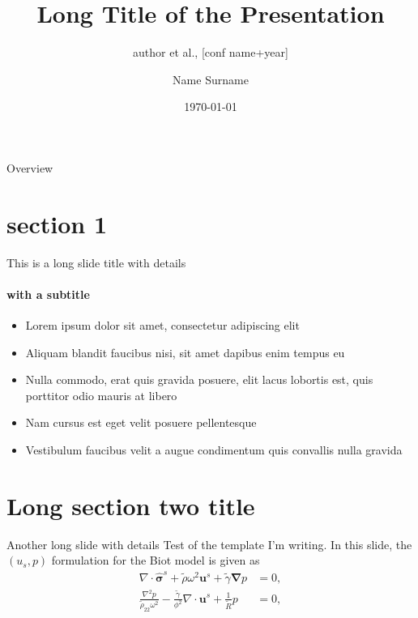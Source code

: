 \documentclass[aspectratio=169,xcolor=dvipsnames, t]{beamer}
\title[short title]{Long Title of the Presentation}
\subtitle{author et al., [conf name+year]}
\author[Surname]{Name Surname}
\institute[lab]{Name of the lab and/or institution}
\date{\today} %
\begin{document}
\begin{frame}[plain]
    \maketitle
\end{frame}
\begin{frame}[plain]{Overview}
    \tableofcontents
\end{frame}

\section{section 1}
\begin{frame}[t]{This is a long slide title with details}
    \framesubtitle{with a subtitle}
    \begin{itemize}
        \item Lorem ipsum dolor sit amet, consectetur adipiscing elit
        \item Aliquam blandit faucibus nisi, sit amet dapibus enim tempus eu
        \item Nulla commodo, erat quis gravida posuere, elit lacus lobortis est, quis porttitor odio mauris at libero
        \item Nam cursus est eget velit posuere pellentesque
        \item Vestibulum faucibus velit a augue condimentum quis convallis nulla gravida
    \end{itemize}
\end{frame}
\section{Long section two title}
\begin{frame}[t]{Another long slide with details}
    Test of the template I'm writing. In this slide, the $(u_s, p)$ formulation for the Biot model is given as 
    \begin{equation}
        \begin{aligned}
            \nabla \cdot \boldsymbol{\hat{\sigma}}^s + \tilde \rho \omega^2 \boldsymbol u^s + \tilde \gamma \boldsymbol \nabla p &= 0, \\
            \frac{\nabla^2 p}{\tilde \rho_{22} \omega^2} - \frac{\tilde \gamma}{\phi^2} \nabla \cdot \boldsymbol u^s + \frac{1}{\tilde R}p &= 0,
        \end{aligned}
        \label{eq:up_motion_equations}
    \end{equation}    
\end{frame}
\end{document}
